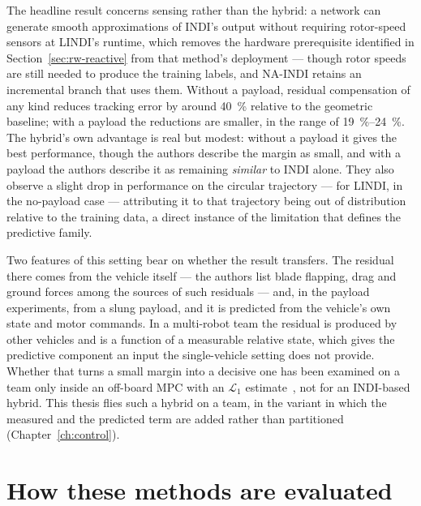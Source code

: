 The headline result concerns sensing rather than the hybrid: a network can generate smooth
approximations of INDI's output without requiring rotor-speed sensors at LINDI's runtime, which
removes the hardware prerequisite identified in Section~\ref{sec:rw-reactive} from that method's
deployment --- though rotor speeds are still needed to produce the training labels, and NA-INDI
retains an incremental branch that uses them. Without a payload, residual compensation of any kind
reduces tracking error by around \SI{40}{\percent} relative to the geometric baseline; with a
payload the reductions are smaller, in the range of \SIrange{19}{24}{\percent}. The hybrid's own
advantage is real but modest: without a payload it gives the best performance, though the authors
describe the margin as small, and with a payload the authors describe it as remaining
\emph{similar} to INDI alone. They also observe a slight drop in performance on the circular
trajectory --- for LINDI, in the no-payload case --- attributing it to that trajectory being out of
distribution relative to the training data, a direct instance of the limitation that defines the
predictive family.

Two features of this setting bear on whether the result transfers. The residual there comes from
the vehicle itself --- the authors list blade flapping, drag and ground forces among the sources of
such residuals --- and, in the payload experiments, from a slung payload, and it is predicted from
the vehicle's own state and motor commands. In a multi-robot team the residual is produced by other
vehicles and is a function of a measurable relative state, which gives the predictive component an
input the single-vehicle setting does not provide. Whether that turns a small margin into a
decisive one has been examined on a team only inside an off-board MPC with an $\mathcal{L}_1$
estimate~\cite{hsieh2025onlineadaptation}, not for an INDI-based hybrid. This thesis flies such a
hybrid on a team, in the variant in which the measured and the predicted term are added rather
than partitioned (Chapter~\ref{ch:control}).

\section{How these methods are evaluated}
\label{sec:rw-eval}

